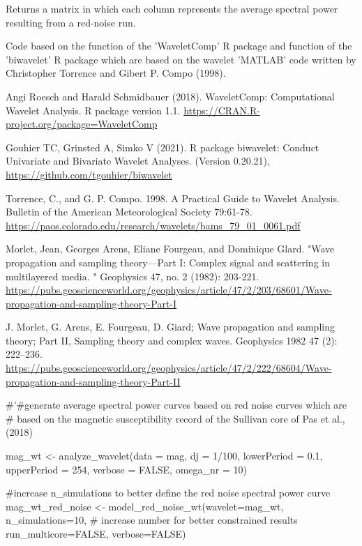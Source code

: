 \documentclass[a4paper]{book}
\begin{document}
%
\begin{Value}
Returns a matrix in which each column represents the average spectral
power resulting from a red-noise run.
\end{Value}
%
\begin{Author}
Code based on the  function of the 'WaveletComp' R package
and  function of the 'biwavelet' R package which are based on the
wavelet 'MATLAB' code written by Christopher Torrence and Gibert P. Compo (1998).
\end{Author}
%
\begin{References}
Angi Roesch and Harald Schmidbauer (2018). WaveletComp: Computational
Wavelet Analysis. R package version 1.1.
\url{https://CRAN.R-project.org/package=WaveletComp}

Gouhier TC, Grinsted A, Simko V (2021). R package biwavelet: Conduct Univariate and Bivariate Wavelet Analyses. (Version 0.20.21),
\url{https://github.com/tgouhier/biwavelet}

Torrence, C., and G. P. Compo. 1998. A Practical Guide to Wavelet Analysis.
Bulletin of the American Meteorological Society 79:61-78.
\url{https://paos.colorado.edu/research/wavelets/bams_79_01_0061.pdf}

Morlet, Jean, Georges Arens, Eliane Fourgeau, and Dominique Glard.
"Wave propagation and sampling theory—Part I: Complex signal and scattering in multilayered media.
" Geophysics 47, no. 2 (1982): 203-221.
\url{https://pubs.geoscienceworld.org/geophysics/article/47/2/203/68601/Wave-propagation-and-sampling-theory-Part-I}

J. Morlet, G. Arens, E. Fourgeau, D. Giard;
Wave propagation and sampling theory; Part II, Sampling theory and complex waves.
Geophysics 1982 47 (2): 222–236. \url{https://pubs.geoscienceworld.org/geophysics/article/47/2/222/68604/Wave-propagation-and-sampling-theory-Part-II}
\end{References}
%
\begin{Examples}
\begin{ExampleCode}

#'#generate average spectral power curves based on red noise curves which are
# based on the magnetic susceptibility record of the Sullivan core of Pas et al., (2018)

mag_wt <- analyze_wavelet(data = mag,
dj = 1/100,
lowerPeriod = 0.1,
upperPeriod = 254,
verbose = FALSE,
omega_nr = 10)

#increase n_simulations to better define the red noise spectral power curve
mag_wt_red_noise <- model_red_noise_wt(wavelet=mag_wt,
n_simulations=10, # increase number for better constrained results
run_multicore=FALSE,
verbose=FALSE)



\end{ExampleCode}
\end{Examples}
\end{document}
